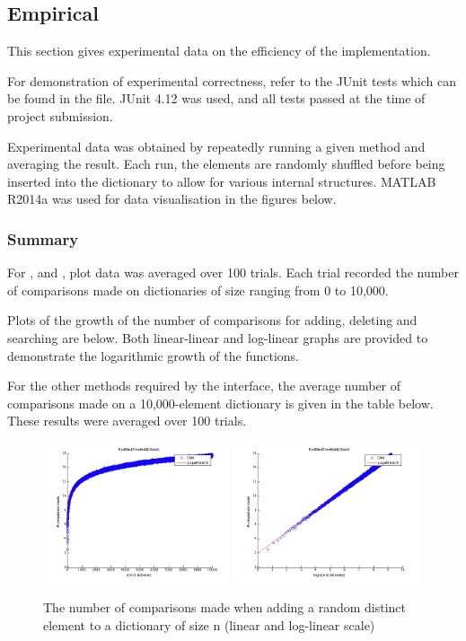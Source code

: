 \subsection{Empirical}

This section gives experimental data on the efficiency of the implementation.

For demonstration of experimental correctness, refer to the JUnit tests which can be found in the  file. JUnit 4.12 was used, and all tests passed at the time of project submission.

Experimental data was obtained by repeatedly running a given method and averaging the result. Each run, the elements are randomly shuffled before being inserted into the dictionary to allow for various internal structures. MATLAB R2014a was used for data visualisation in the figures below.

\subsubsection{Summary}
For ,  and , plot data was averaged over 100 trials. Each trial recorded the number of comparisons made on dictionaries of size ranging from 0 to 10,000.

Plots of the growth of the number of comparisons for adding, deleting and searching are below. Both linear-linear and log-linear graphs are provided to demonstrate the logarithmic growth of the functions.

For the other methods required by the  interface, the average number of comparisons made on a 10,000-element dictionary is given in the table below. These results were averaged over 100 trials.

\begin{figure}[!htbpp]
    \centering
    \includegraphics[width=0.49\textwidth]{resources/add}
    \includegraphics[width=0.49\textwidth]{resources/add_log}
    \caption{The number of comparisons made when adding a random distinct element to a dictionary of size n (linear and log-linear scale)}

\end{figure}

